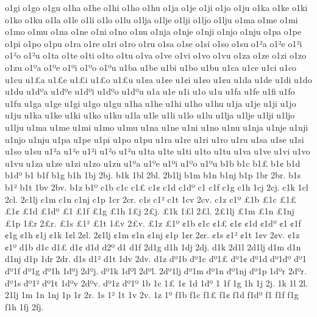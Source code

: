 {o1gi
o1go
o1gu
o1ha
o1he
o1hi
o1ho
o1hu
o1ja
o1je
o1ji
o1jo
o1ju
o1ka
o1ke
o1ki
o1ko
o1ku
o1la
o1le
o1li
o1lo
o1lu
o1lja
o1lje
o1lji
o1ljo
o1lju
o1ma
o1me
o1mi
o1mo
o1mu
o1na
o1ne
o1ni
o1no
o1nu
o1nja
o1nje
o1nji
o1njo
o1nju
o1pa
o1pe
o1pi
o1po
o1pu
o1ra
o1re
o1ri
o1ro
o1ru
o1sa
o1se
o1si
o1so
o1su
o1^^b2a
o1^^b2e
o1^^b2i
o1^^b2o
o1^^b2u
o1ta
o1te
o1ti
o1to
o1tu
o1va
o1ve
o1vi
o1vo
o1vu
o1za
o1ze
o1zi
o1zo
o1zu
o1^^baa
o1^^bae
o1^^bai
o1^^bao
o1^^bau
u1ba
u1be
u1bi
u1bo
u1bu
u1ca
u1ce
u1ci
u1co
u1cu
u1^^a3a
u1^^a3e
u1^^a3i
u1^^a3o
u1^^a3u
u1^^a2a
u1^^a2e
u1^^a2i
u1^^a2o
u1^^a2u
u1da
u1de
u1di
u1do
u1du
u1d^^baa
u1d^^bae
u1d^^bai
u1d^^bao
u1d^^bau
u1^^9ea
u1^^9ee
u1^^9ei
u1^^9eo
u1^^9eu
u1fa
u1fe
u1fi
u1fo
u1fu
u1ga
u1ge
u1gi
u1go
u1gu
u1ha
u1he
u1hi
u1ho
u1hu
u1ja
u1je
u1ji
u1jo
u1ju
u1ka
u1ke
u1ki
u1ko
u1ku
u1la
u1le
u1li
u1lo
u1lu
u1lja
u1lje
u1lji
u1ljo
u1lju
u1ma
u1me
u1mi
u1mo
u1mu
u1na
u1ne
u1ni
u1no
u1nu
u1nja
u1nje
u1nji
u1njo
u1nju
u1pa
u1pe
u1pi
u1po
u1pu
u1ra
u1re
u1ri
u1ro
u1ru
u1sa
u1se
u1si
u1so
u1su
u1^^b2a
u1^^b2e
u1^^b2i
u1^^b2o
u1^^b2u
u1ta
u1te
u1ti
u1to
u1tu
u1va
u1ve
u1vi
u1vo
u1vu
u1za
u1ze
u1zi
u1zo
u1zu
u1^^baa
u1^^bae
u1^^bai
u1^^bao
u1^^bau
%
b1b
b1c
b1^^a3
b1^^a2
b1d
b1d^^ba
b1^^9e
b1f
b1g
b1h
1bj
2bj.
b1k
1bl
2bl.
2b1lj
b1m
b1n
b1nj
b1p
1br
2br.
b1s
b1^^b2
b1t
1bv
2bv.
b1z
b1^^ba
c1b
c1c
c1^^a3
c1^^a2
c1d
c1d^^ba
c1^^9e
c1f
c1g
c1h
1cj
2cj.
c1k
1cl
2cl.
2c1lj
c1m
c1n
c1nj
c1p
1cr
2cr.
c1s
c1^^b2
c1t
1cv
2cv.
c1z
c1^^ba
^^a31b
^^a31c
^^a31^^a3
^^a31^^a2
^^a31d
^^a31d^^ba
^^a31^^9e
^^a31f
^^a31g
^^a31h
1^^a3j
2^^a3j.
^^a31k
1^^a3l
2^^a3l.
2^^a31lj
^^a31m
^^a31n
^^a31nj
^^a31p
1^^a3r
2^^a3r.
^^a31s
^^a31^^b2
^^a31t
1^^a3v
2^^a3v.
^^a31z
^^a31^^ba
^^a21b
^^a21c
^^a21^^a3
^^a21^^a2
^^a21d
^^a21d^^ba
^^a21^^9e
^^a21f
^^a21g
^^a21h
^^a21j
^^a21k
1^^a2l
2^^a2l.
2^^a21lj
^^a21m
^^a21n
^^a21nj
^^a21p
1^^a2r
2^^a2r.
^^a21s
^^a21^^b2
^^a21t
1^^a2v
2^^a2v.
^^a21z
^^a21^^ba
d1b
d1c
d1^^a3
d1^^a2
d1d
d2^^ba
d1^^9e
d1f
2d1g
d1h
1dj
2dj.
d1k
2d1l
2d1lj
d1m
d1n
d1nj
d1p
1dr
2dr.
d1s
d1^^b2
d1t
1dv
2dv.
d1z
d^^ba1b
d^^ba1c
d^^ba1^^a3
d^^ba1^^a2
d^^ba1d
d^^ba1d^^ba
d^^ba1^^9e
d^^ba1f
d^^ba1g
d^^ba1h
1d^^baj
2d^^baj.
d^^ba1k
1d^^bal
2d^^bal.
2d^^ba1lj
d^^ba1m
d^^ba1n
d^^ba1nj
d^^ba1p
1d^^bar
2d^^bar.
d^^ba1s
d^^ba1^^b2
d^^ba1t
1d^^bav
2d^^bav.
d^^ba1z
d^^ba1^^ba
^^9e1b
^^9e1c
^^9e1^^a3
^^9e1^^a2
^^9e1d
^^9e1d^^ba
^^9e1^^9e
^^9e1f
^^9e1g
^^9e1h
1^^9ej
2^^9ej.
^^9e1k
1^^9el
2^^9el.
2^^9e1lj
^^9e1m
^^9e1n
^^9e1nj
^^9e1p
1^^9er
2^^9er.
^^9e1s
^^9e1^^b2
^^9e1t
1^^9ev
2^^9ev.
^^9e1z
^^9e1^^ba
f1b
f1c
f1^^a3
f1^^a2
f1d
f1d^^ba
f1^^9e
f1f
f1g
f1h
1fj
2fj.
}
